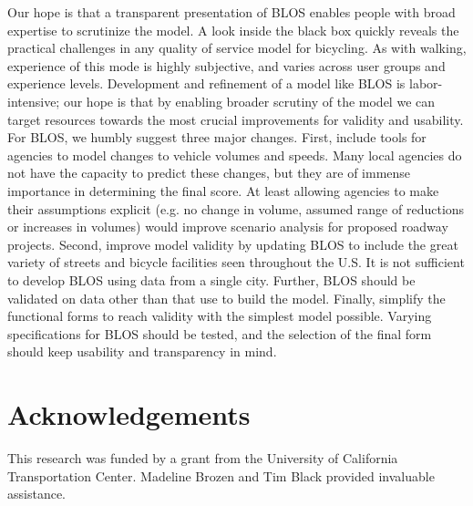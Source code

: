\documentclass[11pt]{article} %
\begin{document}
Our hope is that a transparent presentation of BLOS enables people with broad expertise to scrutinize the model. A look inside the black box quickly reveals the practical challenges in any quality of service model for bicycling. As with walking, experience of this mode is highly subjective, and varies across user groups and experience levels. Development and refinement of a model like BLOS is labor-intensive; our hope is that by enabling broader scrutiny of the model we can target resources towards the most crucial improvements for validity and usability. For BLOS, we humbly suggest three major changes. First, include tools for agencies to model changes to vehicle volumes and speeds. Many local agencies do not have the capacity to predict these changes, but they are of immense importance in determining the final score. At least allowing agencies to make their assumptions explicit (e.g. no change in volume, assumed range of reductions or increases in volumes) would improve scenario analysis for proposed roadway projects. Second, improve model validity by updating BLOS to include the great variety of streets and bicycle facilities seen throughout the U.S. It is not sufficient to develop BLOS using data from a single city. Further, BLOS should be validated on data other than that use to build the model. Finally, simplify the functional forms to reach validity with the simplest model possible. Varying specifications for BLOS should be tested, and the selection of the final form should keep usability and transparency in mind. 

\section{Acknowledgements}
This research was funded by a grant from the University of California Transportation Center.  Madeline Brozen and Tim Black provided invaluable assistance.
\end{document}
